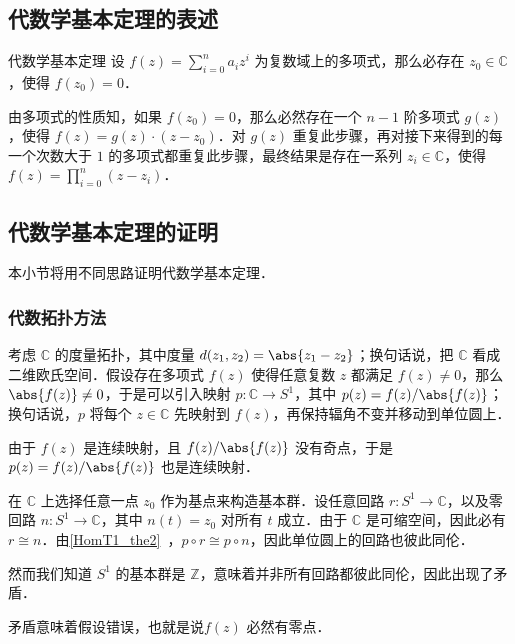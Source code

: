 
\begin{issues}
\issueTODO
\end{issues}


\subsection{代数学基本定理的表述}

\begin{definition}{代数学基本定理}
设 $f(z)=\sum\limits_{i=0}^n a_iz^i$ 为复数域上的多项式，那么必存在 $z_0\in\mathbb{C}$，使得 $f(z_0)=0$．
\end{definition}

由多项式的性质知，如果 $f(z_0)=0$，那么必然存在一个 $n-1$ 阶多项式 $g(z)$，使得 $f(z)=g(z)\cdot(z-z_0)$．对 $g(z)$ 重复此步骤，再对接下来得到的每一个次数大于 $1$ 的多项式都重复此步骤，最终结果是存在一系列 $z_i\in\mathbb{C}$，使得 $f(z)=\prod\limits_{i=0}^{n}(z-z_i)$．

\subsection{代数学基本定理的证明}

本小节将用不同思路证明代数学基本定理．

\subsubsection{代数拓扑方法}

考虑 $\mathbb{C}$ 的度量拓扑，其中度量 $d(z_1, z_2)=\abs{z_1-z_2}$；换句话说，把 $\mathbb{C}$ 看成二维欧氏空间．假设存在多项式 $f(z)$ 使得任意复数 $z$ 都满足 $f(z)\not=0$，那么 $\abs{f(z)}\not=0$，于是可以引入映射 $p:\mathbb{C}\rightarrow S^1$，其中 $p(z)=f(z)/\abs{f(z)}$；换句话说，$p$ 将每个 $z\in\mathbb{C}$ 先映射到 $f(z)$，再保持辐角不变并移动到单位圆上．

由于 $f(z)$ 是连续映射，且 $f(z)/\abs{f(z)}$ 没有奇点，于是 $p(z)=f(z)/\abs{f(z)}$ 也是连续映射．

在 $\mathbb{C}$ 上选择任意一点 $z_0$ 作为基点来构造基本群．设任意回路 $r:S^1\rightarrow\mathbb{C}$，以及零回路 $n:S^1\rightarrow\mathbb{C}$，其中 $n(t)=z_0$ 对所有 $t$ 成立．由于 $\mathbb{C}$ 是可缩空间，因此必有 $r\cong n$．由\autoref{HomT1_the2}~，$p\circ r\cong p\circ n$，因此单位圆上的回路也彼此同伦．

然而我们知道 $S^1$ 的基本群是 $\mathbb{Z}$，意味着并非所有回路都彼此同伦，因此出现了矛盾．

矛盾意味着假设错误，也就是说$f(z)$ 必然有零点．


